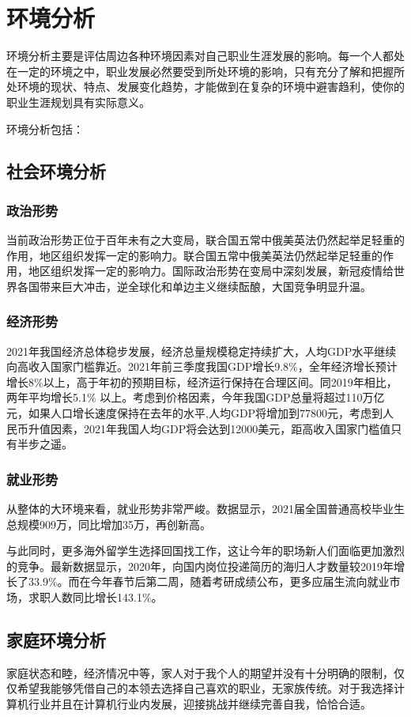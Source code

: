 \documentclass{article}
\begin{document}
\section{环境分析}
环境分析主要是评估周边各种环境因素对自己职业生涯发展的影响。每一个人都处在一定的环境之中，职业发展必然要受到所处环境的影响，只有充分了解和把握所处环境的现状、特点、发展变化趋势，才能做到在复杂的环境中避害趋利，使你的职业生涯规划具有实际意义。\par
环境分析包括：\par
\subsection{社会环境分析}
\subsubsection{政治形势}
当前政治形势正位于百年未有之大变局，联合国五常中俄美英法仍然起举足轻重的作用，地区组织发挥一定的影响力。联合国五常中俄美英法仍然起举足轻重的作用，地区组织发挥一定的影响力。国际政治形势在变局中深刻发展，新冠疫情给世界各国带来巨大冲击，逆全球化和单边主义继续酝酿，大国竞争明显升温。
\subsubsection{经济形势}
2021年我国经济总体稳步发展，经济总量规模稳定持续扩大，人均GDP水平继续向高收入国家门槛靠近。2021年前三季度我国GDP增长9.8\%，全年经济增长预计增长8\%以上，高于年初的预期目标，经济运行保持在合理区间。同2019年相比，两年平均增长5.1\% 以上。考虑到价格因素，今年我国GDP总量将超过110万亿元，如果人口增长速度保持在去年的水平,人均GDP将增加到77800元，考虑到人民币升值因素，2021年我国人均GDP将会达到12000美元，距高收入国家门槛值只有半步之遥。
\subsubsection{就业形势}
从整体的大环境来看，就业形势非常严峻。数据显示，2021届全国普通高校毕业生总规模909万，同比增加35万，再创新高。
\par
与此同时，更多海外留学生选择回国找工作，这让今年的职场新人们面临更加激烈的竞争。最新数据显示，2020年，向国内岗位投递简历的海归人才数量较2019年增长了33.9\%。而在今年春节后第二周，随着考研成绩公布，更多应届生流向就业市场，求职人数同比增长143.1\%。
\par
\subsection{家庭环境分析}
家庭状态和睦，经济情况中等，家人对于我个人的期望并没有十分明确的限制，仅仅希望我能够凭借自己的本领去选择自己喜欢的职业，无家族传统。对于我选择计算机行业并且在计算机行业内发展，迎接挑战并继续完善自我，恰恰合适。
\par
\end{document}
